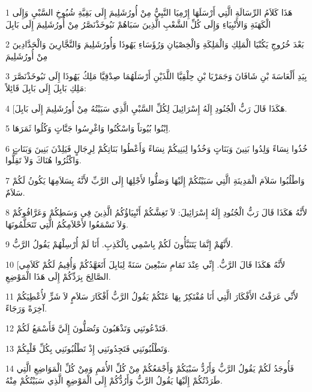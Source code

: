 \par 1 هَذَا كَلاَمُ الرِّسَالَةِ الَّتِي أَرْسَلَهَا إِرْمِيَا النَّبِيُّ مِنْ أُورُشَلِيمَ إِلَى بَقِيَّةِ شُيُوخِ السَّبْيِ وَإِلَى الْكَهَنَةِ وَالأَنْبِيَاءِ وَإِلَى كُلِّ الشَّعْبِ الَّذِينَ سَبَاهُمْ نَبُوخَذْنَصَّرُ مِنْ أُورُشَلِيمَ إِلَى بَابِلَ
\par 2 بَعْدَ خُرُوجِ يَكُنْيَا الْمَلِكِ وَالْمَلِكَةِ وَالْخِصْيَانِ وَرُؤَسَاءِ يَهُوذَا وَأُورُشَلِيمَ وَالنَّجَّارِينَ وَالْحَدَّادِينَ مِنْ أُورُشَلِيمَ
\par 3 بِيَدِ أَلْعَاسَةَ بْنِ شَافَانَ وَجَمَرْيَا بْنِ حِلْقِيَّا اللَّذَيْنِ أَرْسَلَهُمَا صِدْقِيَّا مَلِكُ يَهُوذَا إِلَى نَبُوخَذْنَصَّرَ مَلِكِ بَابِلَ إِلَى بَابِلَ قَائِلاً:
\par 4 [هَكَذَا قَالَ رَبُّ الْجُنُودِ إِلَهُ إِسْرَائِيلَ لِكُلِّ السَّبْيِ الَّذِي سَبَيْتُهُ مِنْ أُورُشَلِيمَ إِلَى بَابِلَ.
\par 5 اِبْنُوا بُيُوتاً وَاسْكُنُوا وَاغْرِسُوا جَنَّاتٍ وَكُلُوا ثَمَرَهَا.
\par 6 خُذُوا نِسَاءً وَلِدُوا بَنِينَ وَبَنَاتٍ وَخُذُوا لِبَنِيكُمْ نِسَاءً وَأَعْطُوا بَنَاتِكُمْ لِرِجَالٍ فَيَلِدْنَ بَنِينَ وَبَنَاتٍ وَاكْثُرُوا هُنَاكَ وَلاَ تَقِلُّوا.
\par 7 وَاطْلُبُوا سَلاَمَ الْمَدِينَةِ الَّتِي سَبَيْتُكُمْ إِلَيْهَا وَصَلُّوا لأَجْلِهَا إِلَى الرَّبِّ لأَنَّهُ بِسَلاَمِهَا يَكُونُ لَكُمْ سَلاَمٌ.
\par 8 لأَنَّهُ هَكَذَا قَالَ رَبُّ الْجُنُودِ إِلَهُ إِسْرَائِيلَ: لاَ تَغِشَّكُمْ أَنْبِيَاؤُكُمُ الَّذِينَ فِي وَسَطِكُمْ وَعَرَّافُوكُمْ وَلاَ تَسْمَعُوا لأَحْلاَمِكُمُ الَّتِي تَتَحَلَّمُونَهَا.
\par 9 لأَنَّهُمْ إِنَّمَا يَتَنَبَّأُونَ لَكُمْ بِاسْمِي بِالْكَذِبِ. أَنَا لَمْ أُرْسِلْهُمْ يَقُولُ الرَّبُّ.
\par 10 [لأَنَّهُ هَكَذَا قَالَ الرَّبُّ. إِنِّي عِنْدَ تَمَامِ سَبْعِينَ سَنَةً لِبَابِلَ أَتَعَهَّدُكُمْ وَأُقِيمُ لَكُمْ كَلاَمِي الصَّالِحَ بِرَدِّكُمْ إِلَى هَذَا الْمَوْضِعِ.
\par 11 لأَنِّي عَرَفْتُ الأَفْكَارَ الَّتِي أَنَا مُفْتَكِرٌ بِهَا عَنْكُمْ يَقُولُ الرَّبُّ أَفْكَارَ سَلاَمٍ لاَ شَرٍّ لأُعْطِيَكُمْ آخِرَةً وَرَجَاءً.
\par 12 فَتَدْعُونَنِي وَتَذْهَبُونَ وَتُصَلُّونَ إِلَيَّ فَأَسْمَعُ لَكُمْ.
\par 13 وَتَطْلُبُونَنِي فَتَجِدُونَنِي إِذْ تَطْلُبُونَنِي بِكُلِّ قَلْبِكُمْ.
\par 14 فَأُوجَدُ لَكُمْ يَقُولُ الرَّبُّ وَأَرُدُّ سَبْيَكُمْ وَأَجْمَعُكُمْ مِنْ كُلِّ الأُمَمِ وَمِنْ كُلِّ الْمَوَاضِعِ الَّتِي طَرَدْتُكُمْ إِلَيْهَا يَقُولُ الرَّبُّ وَأَرُدُّكُمْ إِلَى الْمَوْضِعِ الَّذِي سَبَيْتُكُمْ مِنْهُ.
